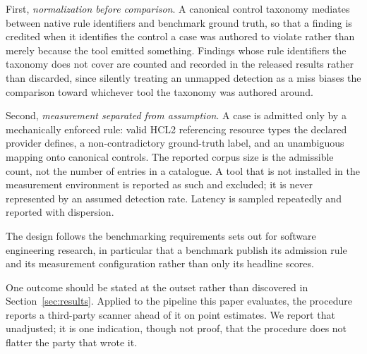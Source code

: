\documentclass[smallextended]{svjour3}
\begin{document}
First, \emph{normalization before comparison}. A canonical control taxonomy
mediates between native rule identifiers and benchmark ground truth, so that a
finding is credited when it identifies the control a case was authored to
violate rather than merely because the tool emitted something. Findings whose
rule identifiers the taxonomy does not cover are counted and recorded in the
released results rather than discarded, since silently treating an unmapped detection as a miss biases
the comparison toward whichever tool the taxonomy was authored around.

Second, \emph{measurement separated from assumption}. A case is admitted only by
a mechanically enforced rule: valid HCL2 referencing resource types the declared
provider defines, a non-contradictory ground-truth label, and an unambiguous
mapping onto canonical controls. The reported corpus size is the admissible count, not the
number of entries in a catalogue. A tool that is not installed in the measurement
environment is reported as such and excluded; it is never represented by an
assumed detection rate. Latency is sampled repeatedly and reported with
dispersion.

The design follows the benchmarking requirements \citet{hasselbring2021benchmarking}
sets out for software engineering research, in particular that a benchmark
publish its admission rule and its measurement configuration rather than only its
headline scores.

One outcome should be stated at the outset rather than discovered in
Section~\ref{sec:results}. Applied to the pipeline this paper evaluates, the
procedure reports a third-party scanner ahead of it on point estimates. We report
that unadjusted; it is one indication, though not proof, that the procedure does
not flatter the party that wrote it.
\end{document}
